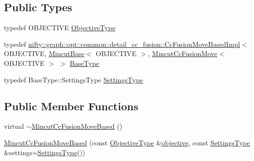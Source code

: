 \subsection*{Public Types}
\begin{DoxyCompactItemize}
\item 
typedef O\+B\+J\+E\+C\+T\+I\+VE \hyperlink{classnifty_1_1graph_1_1opt_1_1mincut_1_1MincutCcFusionMoveBased_a59dd78b1fd2c3ed4f4b969e1d791ae0f}{Objective\+Type}
\item 
typedef \hyperlink{classnifty_1_1graph_1_1opt_1_1common_1_1detail__cc__fusion_1_1CcFusionMoveBasedImpl}{nifty\+::graph\+::opt\+::common\+::detail\+\_\+cc\+\_\+fusion\+::\+Cc\+Fusion\+Move\+Based\+Impl}$<$ O\+B\+J\+E\+C\+T\+I\+VE, \hyperlink{classnifty_1_1graph_1_1opt_1_1mincut_1_1MincutBase}{Mincut\+Base}$<$ O\+B\+J\+E\+C\+T\+I\+VE $>$, \hyperlink{classnifty_1_1graph_1_1opt_1_1mincut_1_1MincutCcFusionMove}{Mincut\+Cc\+Fusion\+Move}$<$ O\+B\+J\+E\+C\+T\+I\+VE $>$ $>$ \hyperlink{classnifty_1_1graph_1_1opt_1_1mincut_1_1MincutCcFusionMoveBased_a6f1a40c6dbc959fbdca5ff26e99913ba}{Base\+Type}
\item 
typedef Base\+Type\+::\+Settings\+Type \hyperlink{classnifty_1_1graph_1_1opt_1_1mincut_1_1MincutCcFusionMoveBased_a28a85c9732f7bf4b309560aeb66f40a5}{Settings\+Type}
\end{DoxyCompactItemize}
\subsection*{Public Member Functions}
\begin{DoxyCompactItemize}
\item 
virtual \hyperlink{classnifty_1_1graph_1_1opt_1_1mincut_1_1MincutCcFusionMoveBased_a6ca0c7c2604a3b8dc92b5e8fda8e1e80}{$\sim$\+Mincut\+Cc\+Fusion\+Move\+Based} ()
\item 
\hyperlink{classnifty_1_1graph_1_1opt_1_1mincut_1_1MincutCcFusionMoveBased_a90c20c7e0d74535b6b2cc8faf66f8753}{Mincut\+Cc\+Fusion\+Move\+Based} (const \hyperlink{classnifty_1_1graph_1_1opt_1_1mincut_1_1MincutCcFusionMoveBased_a59dd78b1fd2c3ed4f4b969e1d791ae0f}{Objective\+Type} \&\hyperlink{classnifty_1_1graph_1_1opt_1_1common_1_1detail__cc__fusion_1_1CcFusionMoveBasedImpl_af9355be55bd8497b059a2e5b1842a20b}{objective}, const \hyperlink{classnifty_1_1graph_1_1opt_1_1mincut_1_1MincutCcFusionMoveBased_a28a85c9732f7bf4b309560aeb66f40a5}{Settings\+Type} \&settings=\hyperlink{classnifty_1_1graph_1_1opt_1_1mincut_1_1MincutCcFusionMoveBased_a28a85c9732f7bf4b309560aeb66f40a5}{Settings\+Type}())
\end{DoxyCompactItemize}


